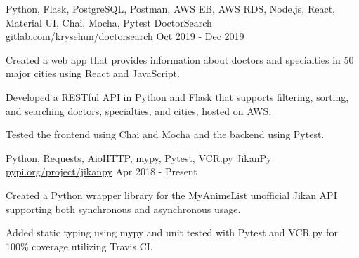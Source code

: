 

\begin{cventries}

  \cventry
  {Python, Flask, PostgreSQL, Postman, AWS EB, AWS RDS, Node.js, React, Material UI, Chai, Mocha, Pytest} %
  {DoctorSearch} %
  {\href{https://gitlab.com/krysehun/doctorsearch}{gitlab.com/krysehun/doctorsearch}} %
  {Oct 2019 - Dec 2019} %
  {
    \begin{cvitems} %
      \item {Created a web app that provides information about doctors and specialties in 50 major cities using React and JavaScript.}
      \item {Developed a RESTful API in Python and Flask that supports filtering, sorting, and searching doctors, specialties, and cities, hosted on AWS.}
      \item {Tested the frontend using Chai and Mocha and the backend using Pytest.}
    \end{cvitems}
  }

  \cventry
  {Python, Requests, AioHTTP, mypy, Pytest, VCR.py} %
  {JikanPy} %
  {\href{https://pypi.org/project/jikanpy/}{pypi.org/project/jikanpy}} %
  {Apr 2018 - Present} %
  {
    \begin{cvitems} %
      \item {Created a Python wrapper library for the MyAnimeList unofficial Jikan API supporting both synchronous and asynchronous usage.}
      \item {Added static typing using mypy and unit tested with Pytest and VCR.py for 100\% coverage utilizing Travis CI.}
    \end{cvitems}
  }

\end{cventries}
